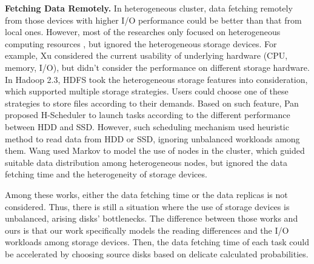 \documentclass[conference]{IEEEtran}
\begin{document}
\textbf{Fetching Data Remotely.} 
In heterogeneous cluster, data fetching remotely from those devices with higher I/O performance could be better than that from local ones.
However, most of the researches only focused on heterogeneous computing resources \cite{b25} \cite{b26} \cite{b35} \cite{b36} \cite{b6}, but ignored the heterogeneous storage devices. For example, Xu \cite{b6} considered the current usability of underlying hardware (CPU, memory, I/O), but didn't consider the performance on different storage hardware. 
In Hadoop 2.3, HDFS\cite{b19} took the heterogeneous storage features into consideration, which supported multiple storage strategies. Users could choose one of these strategies to store files according to their demands.
Based on such feature, Pan \cite{b7} proposed H-Scheduler to launch tasks according to the different performance between HDD and SSD. However, such scheduling mechanism used heuristic method to read data from HDD or SSD, ignoring unbalanced workloads among them.
Wang \cite{b8} used Markov to model the use of nodes in the cluster, which guided suitable data distribution among heterogeneous nodes, but ignored the data fetching time and the heterogeneity of storage devices. %

Among these works, either the data fetching time or the data replicas is not considered. Thus, there is still a situation where the use of storage devices is unbalanced, arising disks' bottlenecks. %
The difference between those works and ours is that our work specifically models the reading differences and the I/O workloads among storage devices. Then, the data fetching time of each task could be accelerated by choosing source disks based on delicate calculated probabilities.
\end{document}
